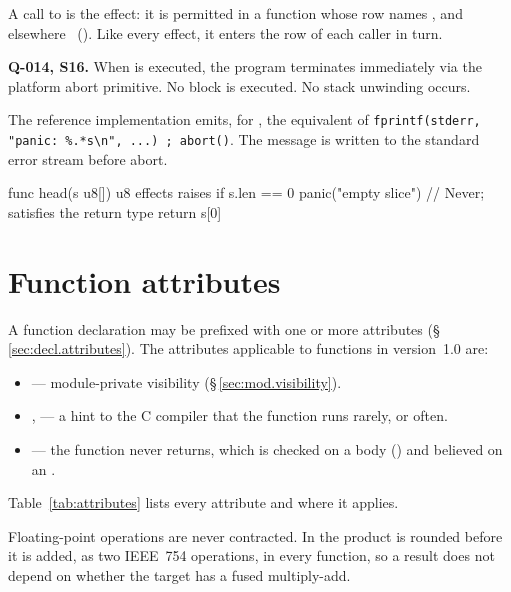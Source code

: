 \pnum
A call to  is the  effect: it is permitted in a function whose
row names , and elsewhere \illformed{}~().  Like every effect,
it enters the row of each caller in turn.

\begin{constraint}
  \textbf{Q-014, S16.}
  When  is executed, the program terminates immediately
  via the platform abort primitive.  No  block is
  executed.  No stack unwinding occurs.
\end{constraint}

\begin{note}
  The reference implementation emits, for , the
  equivalent of
  \texttt{fprintf(stderr, "panic: \%.*s\textbackslash{}n", ...) ; abort()}.
  The message is written to the standard error stream before abort.
\end{note}

\begin{example}
\begin{laincode}
func head(s u8[]) u8 effects raises {
    if s.len == 0 {
        panic("empty slice")    // Never; satisfies the return type
    }
    return s[0]
}
\end{laincode}
\end{example}

\section{Function attributes}
\label{sec:fn.attributes}

\pnum
A function declaration may be prefixed with one or more attributes
(\S\,\ref{sec:decl.attributes}).  The attributes applicable to
functions in version~1.0 are:

\begin{itemize}
  \item \tok{[private]} --- module-private visibility
        (\S\,\ref{sec:mod.visibility}).
  \item \tok{[cold]}, \tok{[hot]} --- a hint to the C compiler that the function runs
        rarely, or often.
  \item \tok{[noreturn]} --- the function never returns, which is checked on a body
        () and believed on an .
\end{itemize}
Table~\ref{tab:attributes} lists every attribute and where it applies.

\pnum
Floating-point operations are never contracted.  In  the product is rounded
before it is added, as two IEEE~754 operations, in every function, so a result does not depend on
whether the target has a fused multiply-add.

